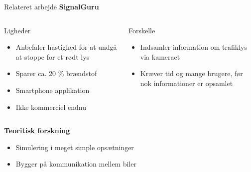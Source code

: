 \begin{frame}{Relateret arbejde}
\textbf{SignalGuru}
\vspace{2mm}
\begin{columns}
	\begin{column}{0.45\textwidth}
		Ligheder
		\begin{itemize}
			\item Anbefaler hastighed for at undgå at stoppe for et rødt lys
			\item Sparer ca. 20 \% brændstof
			\item Smartphone applikation
			\item Ikke kommerciel endnu
		\end{itemize}
	\end{column}

	\begin{column}{0.45\textwidth}
		Forskelle
		\begin{itemize}
			\item Indsamler information om trafiklys via kameraet
			\item Kræver tid og mange brugere, før nok informationer er opsamlet
		\end{itemize}
		\vspace{5mm}
	\end{column}
\end{columns}
\vspace{5mm}

\textbf{Teoritisk forskning}
\vspace{1mm}
\begin{itemize}
	\item Simulering i meget simple opsætninger
	\item Bygger på kommunikation mellem biler
\end{itemize}
\end{frame}

